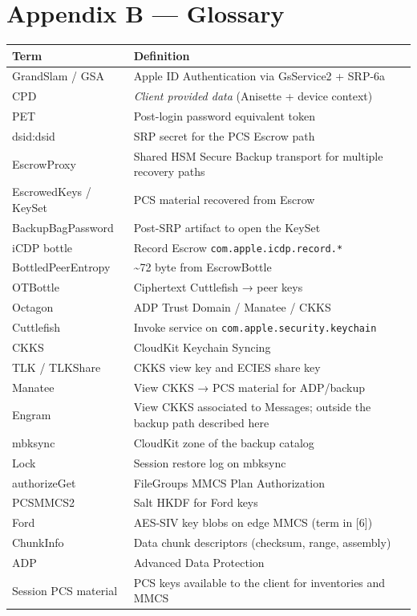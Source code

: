 \documentclass[
  english,
  10pt]{article}
\newcounter{none} %
\begin{document}
\section{Appendix B --- Glossary}\label{appendix-b-glossary}

{\def\LTcaptype{none} %
\begin{longtable}[]{@{}
  >{\raggedright\arraybackslash}p{}
  >{\raggedright\arraybackslash}p{}@{}}
\toprule\noalign{}
\begin{minipage}[b]{\linewidth}\raggedright
Term
\end{minipage} & \begin{minipage}[b]{\linewidth}\raggedright
Definition
\end{minipage} \\
\midrule\noalign{}
\endhead
\bottomrule\noalign{}
\endlastfoot
GrandSlam / GSA & Apple ID Authentication via GsService2 + SRP-6a \\
CPD & \emph{Client provided data} (Anisette + device context) \\
PET & Post-login password equivalent token \\
dsid:dsid & SRP secret for the PCS Escrow path \\
EscrowProxy & Shared HSM Secure Backup transport for multiple recovery
paths \\
EscrowedKeys / KeySet & PCS material recovered from Escrow \\
BackupBagPassword & Post-SRP artifact to open the KeySet \\
iCDP bottle & Record Escrow \texttt{com.apple.icdp.record.*} \\
BottledPeerEntropy & \textasciitilde72 byte from EscrowBottle \\
OTBottle & Ciphertext Cuttlefish → peer keys \\
Octagon & ADP Trust Domain / Manatee / CKKS \\
Cuttlefish & Invoke service on \texttt{com.apple.security.keychain} \\
CKKS & CloudKit Keychain Syncing \\
TLK / TLKShare & CKKS view key and ECIES share key \\
Manatee & View CKKS → PCS material for ADP/backup \\
Engram & View CKKS associated to Messages; outside the backup path
described here \\
mbksync & CloudKit zone of the backup catalog \\
Lock & Session restore log on mbksync \\
authorizeGet & FileGroups MMCS Plan Authorization \\
PCSMMCS2 & Salt HKDF for Ford keys \\
Ford & AES-SIV key blobs on edge MMCS (term in {[}6{]}) \\
ChunkInfo & Data chunk descriptors (checksum, range, assembly) \\
ADP & Advanced Data Protection \\
Session PCS material & PCS keys available to the client for inventories
and MMCS \\
\end{longtable}
}
\end{document}
